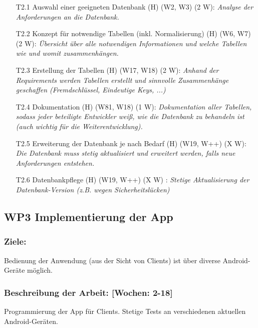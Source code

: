 \documentclass{scrreprt}
\begin{document}
\begin{enumerate}
\item [T2.1] Auswahl einer geeigneten Datenbank (H) (W2, W3) (2 W): \emph{ Analyse der Anforderungen an die Datenbank.}
\item [T2.2] Konzept für notwendige Tabellen (inkl. Normalisierung) (H) (W6, W7) (2 W): \emph{ Übersicht über alle notwendigen Informationen und welche Tabellen wie und womit zusammenhängen.}
\item [T2.3] Erstellung der Tabellen (H) (W17, W18) (2 W): \emph{ Anhand der Requirements werden Tabellen erstellt und sinnvolle Zusammenhänge geschaffen (Fremdschlüssel, Eindeutige Keys, ...)}
\item [T2.4] Dokumentation (H) (W81, W18) (1 W): \emph{ Dokumentation aller Tabellen, sodass jeder beteiligte Entwickler weiß, wie die Datenbank zu behandeln ist (auch wichtig für die Weiterentwicklung).}
\item [T2.5] Erweiterung der Datenbank je nach Bedarf (H) (W19, W++) (X W): \emph{ Die Datenbank muss stetig aktualisiert und erweitert werden, falls neue Anforderungen entstehen.}
\item [T2.6] Datenbankpflege (H) (W19, W++) (X W) : \emph{ Stetige Aktualisierung der Datenbank-Version (z.B. wegen Sicherheitslücken)}
\end{enumerate}

\subsection*{WP3 Implementierung der App}

\subsubsection{Ziele:} Bedienung der Anwendung (aus der Sicht von Clients) ist über diverse Android-Geräte möglich.
\subsubsection{Beschreibung der Arbeit: [Wochen: 2-18]} Programmierung der App für Clients. Stetige Tests an verschiedenen aktuellen Android-Geräten.
\end{document}
